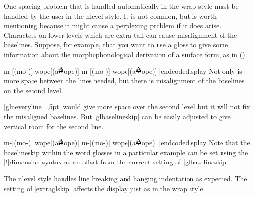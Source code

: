 One spacing problem that is handled automatically in the wrap style
must be handled by the user in the nlevel style.  It is not common,
but is worth mentioning because it might cause a perplexing problem if
it does arise.  Characters on lower levels which are extra tall can
cause misalignment of the baselines.  Suppose, for example, that you
want to use a gloss to give some information about the
morphophonological derivation of a surface form, as in (\nextx).

\def\AccentedBarredW{$\acute{\hbox{$\overline w$}}$}

\framedisplay
\ex[glstyle=nlevel,glneveryline={\it}]
\begingl m-[(mo-)] wope[(a\AccentedBarredW ope)] \endgl \xe
\endframedisplay
\codedisplay
\ex[glstyle=nlevel,glneveryline={\it}]
\begingl m-[(mo-)] wope[(a\AccentedBarredW ope)] \endgl \xe
|endcodedisplay
Not only is more space between the lines needed, but there is
misalignment of the baselines on the second level.

|glneveryline={,5pt}| would give more space over the second level but
it will not fix the misaligned baselines. But |glbaselineskip| can be
easily adjusted to give vertical room for the second line.

\framedisplay
\ex[glstyle=nlevel,glbaselineskip=!6pt]
\begingl m-[(mo-)] wope[(a\AccentedBarredW ope)] \endgl \xe
\endframedisplay
\codedisplay
\ex[glstyle=nlevel,glbaselineskip=!6pt]
\begingl m-[(mo-)] wope[(a\AccentedBarredW ope)] \endgl
\xe
|endcodedisplay
Note that the baselineskip within the word glosses in a particular
example can be set using the |!|dimension syntax as an offset from the
current setting of |glbaselineskip|.

The nlevel style handles line breaking and hanging indentation as
expected.  The setting of |extraglskip| affects the display just as in
the wrap style.

